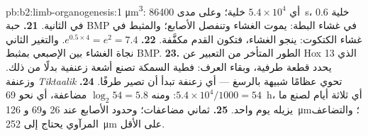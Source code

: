 \begin{solution}{pb:b2:limb-organogenesis:1}
\unit{\micro m^3}: أي $5.4\times 10^{4}$ خلية؛ وعلى مدى \qty{86400}{s}،
$0.6$ خلية في الثانية.
\textbf{21.} حبة BMP في غشاء البطة: يموت الغشاء وتنفصل
الأصابع؛ والمثبط في غشاء الكتكوت: ينجو الغشاء، فتكون القدم
مكفَّفة.
\textbf{22.} $e^{0.5\times 4} = e^{2} = 7.4$. والتغير الثاني
نجاة الغشاء بين الإصبعي بمثبط BMP.
\textbf{23.} الطور المتأخر من التعبير عن Hox 13 الذي يحدد
قطعة طرفية، وبقاء العرف: فطية السمكة تصنع أشعة
زعنفية بدلًا من ذلك. وزعنفة \emph{Tiktaalik} تحوي عظامًا شبيهة بالرسغ --- أي
زعنفة تبدأ أن تصير طرفًا.
\textbf{24.} $5.4\times 10^{4}/1000 = 54$: ومنه $\log_2 54 = 5.8$ مضاعفة،
أي نحو \qty{69}{h}، أي ثلاثة أيام لصنع ما يزيله يوم واحد.
\textbf{25.} ثماني مضاعفات؛ وحدود الأصابع عند 26 و69 و
\qty{126}{\micro m}؛ والتضاعف المرآوي يحتاج إلى
\qty{252}{\micro m} على الأقل.
\end{solution}
